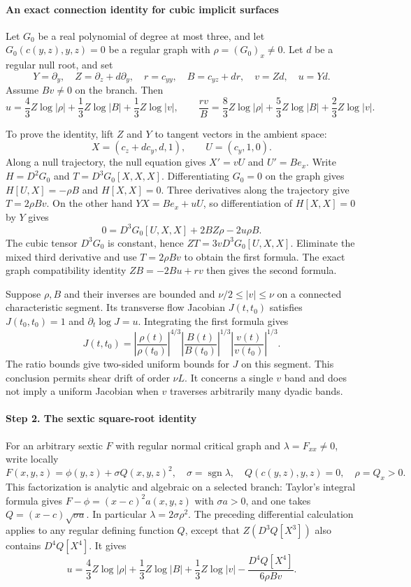 \documentclass[11pt]{amsart}
\theoremstyle{definition}
\theoremstyle{remark}
\numberwithin{equation}{section}
\begin{document}
\paragraph{An exact connection identity for cubic implicit surfaces}

Let $G_0$ be a real polynomial of degree at most three, and let $G_0(c(y,z),y,z)=0$ be a regular graph with $\rho=(G_0)_x\ne0$. Let $d$ be a regular null root, and set
\[
Y=\partial_y,\quad Z=\partial_z+d\partial_y,\quad r=c_{yy},\quad B=c_{yz}+dr,\quad v=Zd,\quad u=Yd.
\]
Assume $Bv\ne0$ on the branch. Then
\begin{equation}\label{low:6:s36cg:cubic-connection}
u=\frac43 Z\log|\rho|+\frac13Z\log|B|+\frac13Z\log|v|,
\qquad
\frac{rv}{B}=\frac83Z\log|\rho|+\frac53Z\log|B|+\frac23Z\log|v|.
\end{equation}

To prove the identity, lift $Z$ and $Y$ to tangent vectors in the ambient space:
\[
X=(c_z+dc_y,d,1),\qquad U=(c_y,1,0).
\]
Along a null trajectory, the null equation gives $X'=vU$ and $U'=Be_x$. Write $H=D^2G_0$ and $T=D^3G_0[X,X,X]$. Differentiating $G_0=0$ on the graph gives $H[U,X]=-\rho B$ and $H[X,X]=0$. Three derivatives along the trajectory give $T=2\rho Bv$. On the other hand $YX=Be_x+uU$, so differentiation of $H[X,X]=0$ by $Y$ gives
\[
0=D^3G_0[U,X,X]+2B Z\rho-2u\rho B.
\]
The cubic tensor $D^3G_0$ is constant, hence $ZT=3vD^3G_0[U,X,X]$. Eliminate the mixed third derivative and use $T=2\rho Bv$ to obtain the first formula. The exact graph compatibility identity $ZB=-2Bu+rv$ then gives the second formula.

Suppose $\rho,B$ and their inverses are bounded and $\nu/2\le|v|\le\nu$ on a connected characteristic segment. Its transverse flow Jacobian $J(t,t_0)$ satisfies $J(t_0,t_0)=1$ and $\partial_t\log J=u$. Integrating the first formula gives
\[
J(t,t_0)=\left|\frac{\rho(t)}{\rho(t_0)}\right|^{4/3}\left|\frac{B(t)}{B(t_0)}\right|^{1/3}\left|\frac{v(t)}{v(t_0)}\right|^{1/3}.
\]
The ratio bounds give two-sided uniform bounds for $J$ on this segment. This conclusion permits shear drift of order $\nu L$. It concerns a single $v$ band and does not imply a uniform Jacobian when $v$ traverses arbitrarily many dyadic bands.

\paragraph{Step 2. The sextic square-root identity}

For an arbitrary sextic $F$ with regular normal critical graph and $\lambda=F_{xx}\ne0$, write locally
\[
F(x,y,z)=\phi(y,z)+\sigma Q(x,y,z)^2,
\quad \sigma=\operatorname{sgn}\lambda,
\quad Q(c(y,z),y,z)=0,
\quad \rho=Q_x>0.
\]
This factorization is analytic and algebraic on a selected branch: Taylor's integral formula gives $F-\phi=(x-c)^2a(x,y,z)$ with $\sigma a>0$, and one takes $Q=(x-c)\sqrt{\sigma a}$. In particular $\lambda=2\sigma\rho^2$. The preceding differential calculation applies to any regular defining function $Q$, except that $Z(D^3Q[X^3])$ also contains $D^4Q[X^4]$. It gives
\[
u=\frac43Z\log|\rho|+\frac13Z\log|B|+\frac13Z\log|v|-\frac{D^4Q[X^4]}{6\rho Bv}.
\]
\end{document}
